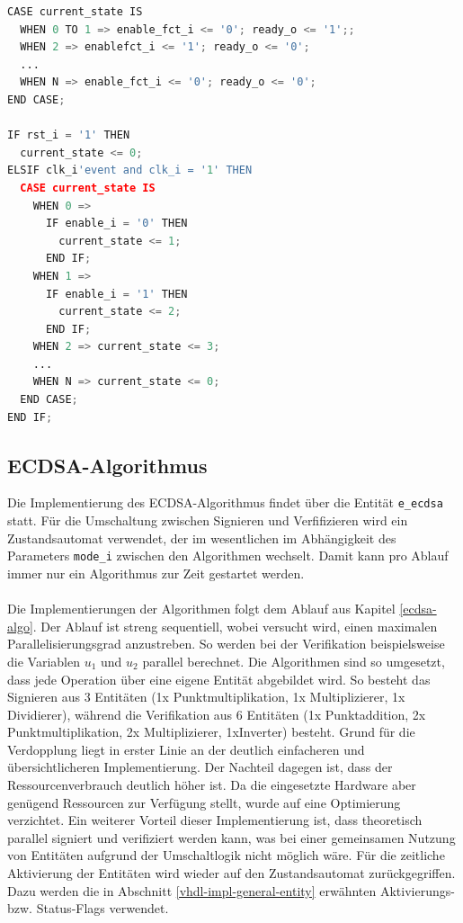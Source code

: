\begin{lstlisting}[language=Python,frame=single,label=lst-fsm,caption=Grundstruktur der Zustandsautomaten]
CASE current_state IS
  WHEN 0 TO 1 => enable_fct_i <= '0'; ready_o <= '1';;
  WHEN 2 => enablefct_i <= '1'; ready_o <= '0';
  ...
  WHEN N => enable_fct_i <= '0'; ready_o <= '0';
END CASE;

IF rst_i = '1' THEN
  current_state <= 0;
ELSIF clk_i'event and clk_i = '1' THEN
  CASE current_state IS
    WHEN 0 => 
      IF enable_i = '0' THEN 
        current_state <= 1; 
      END IF;
    WHEN 1 => 
      IF enable_i = '1' THEN 
        current_state <= 2; 
      END IF;
    WHEN 2 => current_state <= 3;
    ...
    WHEN N => current_state <= 0; 
  END CASE;
END IF;
\end{lstlisting}

\subsection{ECDSA-Algorithmus}

Die Implementierung des ECDSA-Algorithmus findet über die Entität \texttt{e\_ecdsa} statt. Für die Umschaltung zwischen Signieren und Verfifizieren wird ein Zustandsautomat verwendet, der im wesentlichen im Abhängigkeit des Parameters \texttt{mode\_i} zwischen den Algorithmen wechselt. Damit kann pro Ablauf immer nur ein Algorithmus zur Zeit gestartet werden.
\\ \\
Die Implementierungen der Algorithmen folgt dem Ablauf aus Kapitel \ref{ecdsa-algo}. Der Ablauf ist streng sequentiell, wobei versucht wird, einen maximalen Parallelisierungsgrad anzustreben. So werden bei der Verifikation beispielsweise die Variablen $u_1$ und $u_2$ parallel berechnet. Die Algorithmen sind so umgesetzt, dass jede Operation über eine eigene Entität abgebildet wird. So besteht das Signieren aus 3 Entitäten (1x Punktmultiplikation, 1x Multiplizierer, 1x Dividierer), während die Verifikation aus 6 Entitäten (1x Punktaddition, 2x Punktmultiplikation, 2x Multiplizierer, 1xInverter) besteht. Grund für die Verdopplung liegt in erster Linie an der deutlich einfacheren und übersichtlicheren Implementierung. Der Nachteil dagegen ist, dass der Ressourcenverbrauch deutlich höher ist. Da die eingesetzte Hardware aber genügend Ressourcen zur Verfügung stellt, wurde auf eine Optimierung verzichtet. Ein weiterer Vorteil dieser Implementierung ist, dass theoretisch parallel signiert und verifiziert werden kann, was bei einer gemeinsamen Nutzung von Entitäten aufgrund der Umschaltlogik nicht möglich wäre. Für die zeitliche Aktivierung der Entitäten wird wieder auf den Zustandsautomat zurückgegriffen. Dazu werden die in Abschnitt \ref{vhdl-impl-general-entity} erwähnten Aktivierungs- bzw. Status-Flags verwendet. \\

